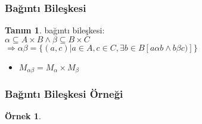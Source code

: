 \documentclass[dvipsnames]{beamer}
\theoremstyle{definition}
\newtheorem{tanim}[theorem]{Tanım}
\theoremstyle{example}
\newtheorem{ornek}[theorem]{Örnek}
\theoremstyle{plain}
\begin{document}
\begin{frame}
  \frametitle{Bağıntı Bileşkesi}

  \begin{tanim}
    \alert{bağıntı bileşkesi}:\\
      $\alpha \subseteq A \times B \wedge \beta \subseteq B \times C$\\
      $\Rightarrow \alpha \beta = \{(a,c) | a \in A, c \in C,
                \exists b \in B [a \alpha b \wedge b \beta c)]\}$
  \end{tanim}

  \begin{itemize}
    \item $M_{\alpha \beta} = M_{\alpha} \times M_{\beta}$
  \end{itemize}
\end{frame}

\begin{frame}
  \frametitle{Bağıntı Bileşkesi Örneği}

  \begin{ornek}
    \begin{columns}
      \begin{center}
      \end{center}

      \begin{center}
      \end{center}
    \end{columns}
  \end{ornek}
\end{frame}
\end{document}
